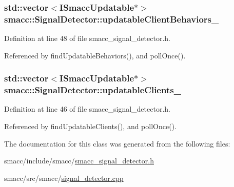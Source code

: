 \subsubsection[{\texorpdfstring{updatable\+Client\+Behaviors\+\_\+}{updatableClientBehaviors_}}]{\setlength{\rightskip}{0pt plus 5cm}std\+::vector$<${\bf I\+Smacc\+Updatable}$\ast$$>$ smacc\+::\+Signal\+Detector\+::updatable\+Client\+Behaviors\+\_\+\hspace{0.3cm}{\ttfamily [private]}}\hypertarget{classsmacc_1_1SignalDetector_a777b671ca6bbedd2fdc83f60f9ec8f83}{}\label{classsmacc_1_1SignalDetector_a777b671ca6bbedd2fdc83f60f9ec8f83}


Definition at line 48 of file smacc\+\_\+signal\+\_\+detector.\+h.



Referenced by find\+Updatable\+Behaviors(), and poll\+Once().

\subsubsection[{\texorpdfstring{updatable\+Clients\+\_\+}{updatableClients_}}]{\setlength{\rightskip}{0pt plus 5cm}std\+::vector$<${\bf I\+Smacc\+Updatable}$\ast$$>$ smacc\+::\+Signal\+Detector\+::updatable\+Clients\+\_\+\hspace{0.3cm}{\ttfamily [private]}}\hypertarget{classsmacc_1_1SignalDetector_a36a702afabbc335cbdb1e8699b669323}{}\label{classsmacc_1_1SignalDetector_a36a702afabbc335cbdb1e8699b669323}


Definition at line 46 of file smacc\+\_\+signal\+\_\+detector.\+h.



Referenced by find\+Updatable\+Clients(), and poll\+Once().



The documentation for this class was generated from the following files\+:\begin{DoxyCompactItemize}
\item 
smacc/include/smacc/\hyperlink{smacc__signal__detector_8h}{smacc\+\_\+signal\+\_\+detector.\+h}\item 
smacc/src/smacc/\hyperlink{signal__detector_8cpp}{signal\+\_\+detector.\+cpp}\end{DoxyCompactItemize}
